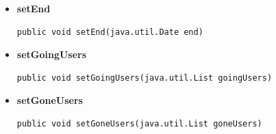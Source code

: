 \documentclass[11pt,a4paper]{article}
\begin{document}
{{{{\begin{itemize}
{\begin{lstlisting}[frame=none]
public void setDescription(java.lang.String description)\end{lstlisting} %
}%
\item{ 
\hypertarget{edu.kit.pse17.go_app.PersistenceLayer.GoEntity.setEnd(java.util.Date)}{{\bf  setEnd}\\}
\begin{lstlisting}[frame=none]
public void setEnd(java.util.Date end)\end{lstlisting} %
}%
\item{ 
\hypertarget{edu.kit.pse17.go_app.PersistenceLayer.GoEntity.setGoingUsers(java.util.List)}{{\bf  setGoingUsers}\\}
\begin{lstlisting}[frame=none]
public void setGoingUsers(java.util.List goingUsers)\end{lstlisting} %
}%
\item{ 
\hypertarget{edu.kit.pse17.go_app.PersistenceLayer.GoEntity.setGoneUsers(java.util.List)}{{\bf  setGoneUsers}\\}
\begin{lstlisting}[frame=none]
public void setGoneUsers(java.util.List goneUsers)\end{lstlisting} %
}%


\end{itemize}}}}}
\end{document}
